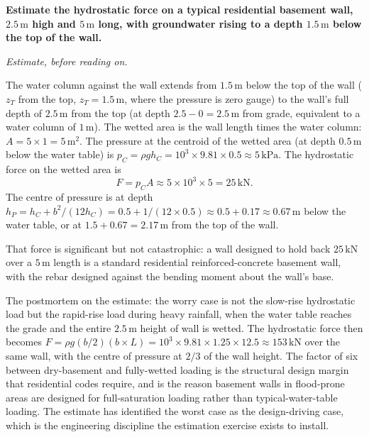 \begin{estimation}
\textbf{Estimate the hydrostatic force on a typical residential
basement wall, $2.5\,\si{\meter}$ high and $5\,\si{\meter}$
long, with groundwater rising to a depth $1.5\,\si{\meter}$ below
the top of the wall.}

\smallskip
\textit{Estimate, before reading on.}

\smallskip
The water column against the wall extends from $1.5\,\si{\meter}$
below the top of the wall ($z_T$ from the top, $z_T = 1.5\,\si{
\meter}$, where the pressure is zero gauge) to the wall's full
depth of $2.5\,\si{\meter}$ from the top (at depth $2.5 - 0 =
2.5\,\si{\meter}$ from grade, equivalent to a water column of
$1\,\si{\meter}$). The wetted area is the wall length times the
water column: $A = 5 \times 1 = 5\,\text{m}^2$. The pressure at
the centroid of the wetted area (at depth $0.5\,\si{\meter}$
below the water table) is $p_C = \rho g h_C = 10^3 \times 9.81
\times 0.5 \approx 5\,\text{kPa}$. The hydrostatic force on the
wetted area is
\[
F = p_C A \approx 5 \times 10^3 \times 5 = 25\,\text{kN}.
\]
The centre of pressure is at depth $h_P = h_C + b^2/(12 h_C)
= 0.5 + 1/(12 \times 0.5) \approx 0.5 + 0.17 \approx 0.67\,\si{
\meter}$ below the water table, or at $1.5 + 0.67 = 2.17\,\si{
\meter}$ from the top of the wall.

That force is significant but not catastrophic: a wall designed
to hold back $25\,\text{kN}$ over a $5\,\si{\meter}$ length is a
standard residential reinforced-concrete basement wall, with
the rebar designed against the bending moment about the wall's
base.

The postmortem on the estimate: the worry case is not the
slow-rise hydrostatic load but the rapid-rise load during heavy
rainfall, when the water table reaches the grade and the entire
$2.5\,\si{\meter}$ height of wall is wetted. The hydrostatic
force then becomes $F = \rho g (b/2) (b \times L) = 10^3 \times
9.81 \times 1.25 \times 12.5 \approx 153\,\text{kN}$ over the
same wall, with the centre of pressure at $2/3$ of the wall
height. The factor of six between dry-basement and fully-wetted
loading is the structural design margin that residential codes
require, and is the reason basement walls in flood-prone areas
are designed for full-saturation loading rather than
typical-water-table loading. The estimate has identified the
worst case as the design-driving case, which is the engineering
discipline the estimation exercise exists to install.
\end{estimation}

